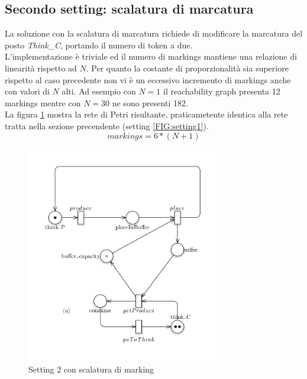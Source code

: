 \documentclass{article}
\begin{document}
\subsection{Secondo  setting: scalatura di marcatura}\label{SEC:secondo-marking}
La soluzione con la scalatura di marcatura richiede di modificare la marcatura del posto \emph{Think\_C}, portando il numero di token a due.\\
L'implementazione è triviale ed il numero di markings mantiene una relazione di linearità rispetto ad $N$.
Per quanto la costante di proporzionalità sia superiore rispetto al caso precedente non vi è un eccessivo incremento di markings anche con valori di $N$ alti.
Ad esempio con $N = 1$ il reachability graph presenta 12 markings mentre con $N = 30$ ne sono presenti 182.\\
La figura \ref{FIG:setting2_markdown} mostra la rete di Petri risultante, praticametente identica alla rete tratta nella sezione precendente (setting \ref{FIG:setting1}). 
$$ markings = 6*(N + 1) $$
\begin{figure}[!ht]
\centering
\includegraphics[width=0.75\textwidth]{./Esercizio2_img/setting2_markdown.png}
\caption{Setting 2 con scalatura di marking} \label{FIG:setting2_markdown}
\end{figure}

\newpage
\end{document}
